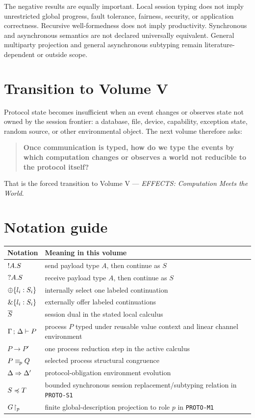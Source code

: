 \documentclass[11pt,openany]{book}
\begin{document}
The negative results are equally important. Local session typing does not imply unrestricted
global progress, fault tolerance, fairness, security, or application correctness. Recursive
well-formedness does not imply productivity. Synchronous and asynchronous semantics are not
declared universally equivalent. General multiparty projection and general asynchronous
subtyping remain literature-dependent or outside scope.

\chapter*{Transition to Volume V}
Protocol state becomes insufficient when an event changes or observes state not owned by the
session frontier: a database, file, device, capability, exception state, random source, or other
environmental object. The next volume therefore asks:

\begin{quote}
\textbf{Once communication is typed, how do we type the events by which computation changes or
observes a world not reducible to the protocol itself?}
\end{quote}

That is the forced transition to Volume V --- \emph{EFFECTS: Computation Meets the World}.

\chapter*{Notation guide}
\begin{tabularx}{\textwidth}{@{}lX@{}}
\toprule
Notation & Meaning in this volume \\
\midrule
\(!A.S\) & send payload type \(A\), then continue as \(S\) \\
\(?A.S\) & receive payload type \(A\), then continue as \(S\) \\
\(\oplus\{l_i:S_i\}\) & internally select one labeled continuation \\
\(\mathbin{\&}\{l_i:S_i\}\) & externally offer labeled continuations \\
\(\overline{S}\) & session dual in the stated local calculus \\
\(\Gamma\,;\,\Delta \vdash P\) & process \(P\) typed under reusable value context and linear channel environment \\
\(P\to P'\) & one process reduction step in the active calculus \\
\(P\equiv_{\!p} Q\) & selected process structural congruence \\
\(\Delta\Rightarrow\Delta'\) & protocol-obligation environment evolution \\
\(S\preccurlyeq T\) & bounded synchronous session replacement/subtyping relation in \texttt{PROTO-S1} \\
\(G\!\upharpoonright_{p}\) & finite global-description projection to role \(p\) in \texttt{PROTO-M1} \\
\bottomrule
\end{tabularx}
\end{document}
